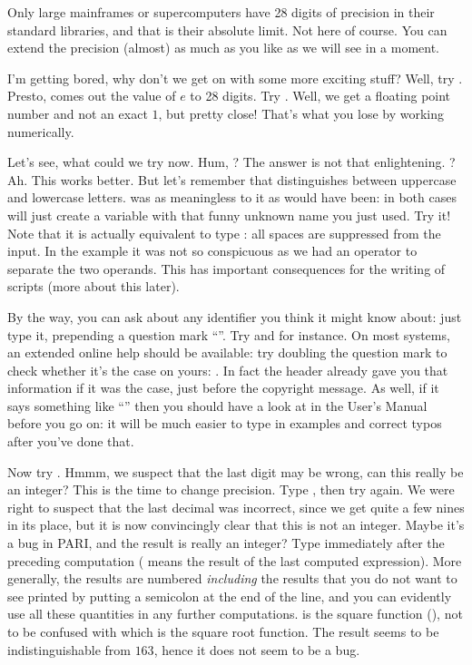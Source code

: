 Only large mainframes or supercomputers have 28 digits of precision in their
standard libraries, and that is their absolute limit. Not here of course. You
can extend the precision (almost) as much as you like as we will see in a
moment.

I'm getting bored, why don't we get on with some more exciting stuff?  Well,
try . Presto, comes out the value of $e$ to 28 digits. Try
. Well, we get a floating point number and not an exact $1$,
but pretty close! That's what you lose by working numerically.

Let's see, what could we try now. Hum, ? The answer is not that
enlightening. ? Ah. This works better. But let's remember that
 distinguishes between uppercase and lowercase letters.  was
as meaningless to it as  would have been: in both cases
 will just create a variable with that funny unknown name you just
used. Try it! Note that it is actually equivalent to type
: all spaces are suppressed from the input. In the
 example  it was not so conspicuous as we had an operator to
separate the two operands. This has important consequences for the writing of
 scripts (more about this later).

By the way, you can ask  about any identifier you think it might know
about: just type it, prepending a question mark ``''. Try 
and  for instance. On most systems, an extended online help should
be available: try doubling the question mark to check whether it's the case
on yours: . In fact the  header already gave you that
information if it was the case, just before the copyright message. As well,
if it says something like ``'' then you should have a
look at  in the User's Manual before you go on: it will
be much easier to type in examples and correct typos after you've done that.

Now try . Hmmm, we suspect that the last digit may
be wrong, can this really be an integer? This is the time to change
precision. Type , then try  again. We
were right to suspect that the last decimal was incorrect, since we get quite
a few nines in its place, but it is now convincingly clear that this is not
an integer. Maybe it's a bug in PARI, and the result is really an integer?
Type  immediately after the preceding computation
(\kbd{\%} means the result of the last computed expression). More generally,
the results are numbered  \emph{including} the results
that you do not want to see printed by putting a semicolon at the end of the
line, and you can evidently use all these quantities in any further
computations.  is the square function (), not to
be confused with  which is the square root function. The result
seems to be indistinguishable from $163$, hence it does not seem to be a bug.

